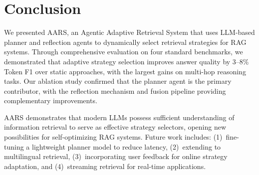 \documentclass[runningheads]{llncs}
\begin{document}
\section{Conclusion}
\label{sec:conclusion}

We presented AARS, an Agentic Adaptive Retrieval System that uses LLM-based planner and reflection agents to dynamically select retrieval strategies for RAG systems. Through comprehensive evaluation on four standard benchmarks, we demonstrated that adaptive strategy selection improves answer quality by 3--8\% Token F1 over static approaches, with the largest gains on multi-hop reasoning tasks. Our ablation study confirmed that the planner agent is the primary contributor, with the reflection mechanism and fusion pipeline providing complementary improvements.

AARS demonstrates that modern LLMs possess sufficient understanding of information retrieval to serve as effective strategy selectors, opening new possibilities for self-optimizing RAG systems. Future work includes: (1)~fine-tuning a lightweight planner model to reduce latency, (2)~extending to multilingual retrieval, (3)~incorporating user feedback for online strategy adaptation, and (4)~streaming retrieval for real-time applications.



\end{document}

